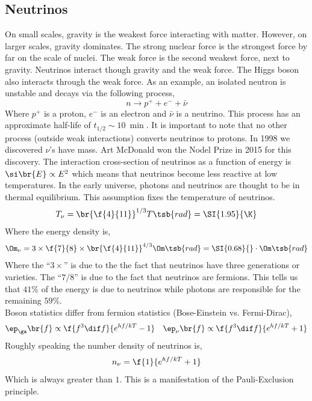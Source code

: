 \documentclass{article}
\begin{document}
\subsection{Neutrinos}

On small scales, gravity is the weakest force interacting with matter. However, on larger scales, gravity dominates. The strong nuclear force is the strongest force by far on the scale of nuclei. The weak force is the second weakest force, next to gravity. Neutrinos interact though gravity and the weak force. The Higgs boson also interacts through the weak force. As an example, an isolated neutron is unstable and decays via the following process,
\[ n \to p^+ + e^- + \bar \nu \]
Where $p^+$ is a proton, $e^-$ is an electron and $\bar \nu$ is a neutrino. This process has an approximate half-life of $t_{1/2} \sim \SI{10}{\min}$. It is important to note that no other process (outside weak interactions) converts neutrinos to protons. In 1998 we discovered $\nu$'s have mass. Art McDonald won the Nodel Prize in 2015 for this discovery. The interaction cross-section of neutrinos as a function of energy is $\si\br{E} \propto E^2$ which means that neutrinos become less reactive at low temperatures. In the early universe, photons and neutrinos are thought to be in thermal equilibrium. This assumption fixes the temperature of neutrinos.
\[ T_{\nu} = \br{\f{4}{11}}^{1/3} T\tsb{rad} = \SI{1.95}{\K} \]
Where the energy density is,
\[ \Om_{\nu} = 3 \times \f{7}{8} \times \br{\f{4}{11}}^{4/3} \Om\tsb{rad} = \SI{0.68}{}\cdot\Om\tsb{rad} \]
Where the ``$3\times$'' is due to the the fact that neutrinos have three generations or varieties. The ``$7/8$'' is due to the fact that neutrinos are fermions. This tells us that $41\%$ of the energy is due to neutrinos while photons are responsible for the remaining $59\%$.\\

Boson statistics differ from fermion statistics (Bose-Einstein vs. Fermi-Dirac),
\[ \ep_\ga\br{f} \propto \f{f^3 \dif f}{e^{hf/kT} - 1} \quad \ep_\nu\br{f} \propto \f{f^3 \dif f}{e^{hf/kT} + 1} \]
Roughly speaking the number density of neutrinos is,
\[ n_\nu = \f{1}{e^{h f/kT} + 1} \]
Which is always greater than $1$. This is a manifestation of the Pauli-Exclusion principle. \\
\end{document}
